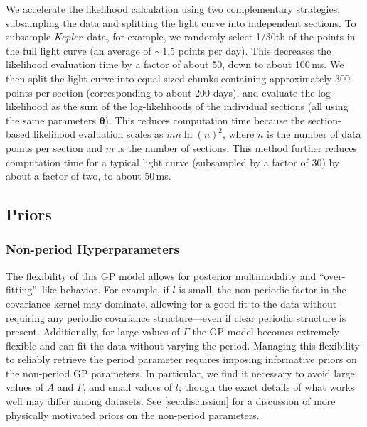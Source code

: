 \documentclass[useAMS, usenatbib, preprint, 12pt]{aastex}
\newcommand{\Kepler}{{\it Kepler}}
\begin{document}
We accelerate the likelihood calculation using two complementary strategies:
subsampling the data and splitting the light curve into independent sections.
To subsample \Kepler\ data, for example,
we randomly select 1/30th of the points
in the full light curve (an average of $\sim$1.5 points per day).
This decreases the likelihood evaluation time by a factor of about 50, down to
about 100\,ms.
We then split the light curve into equal-sized chunks containing approximately
300 points per section (corresponding to about 200 days), and evaluate the
log-likelihood as the sum of the log-likelihoods of the individual sections
(all using the same parameters ${\bm \theta}$).
This reduces computation time because the section-based likelihood evaluation
scales as $mn\ln(n)^2$, where $n$ is the number of data points per section and
$m$ is the number of sections.
This method further reduces computation time for a typical light curve
(subsampled by a factor of 30) by about a factor of two, to about 50\,ms.

\subsection{Priors}
\label{sec:GP_prior}

\subsubsection{Non-period Hyperparameters}
\label{sec:nonperiod_prior}

The flexibility of this GP model allows for posterior multimodality and
``over-fitting''--like behavior.
For example, if $l$ is small, the non-periodic factor in the covariance
kernel may dominate, allowing for a good fit to the data without
requiring any periodic covariance structure---even if clear periodic
structure is present.
Additionally, for large values of $\Gamma$ the GP model becomes extremely
flexible and can fit the data without varying the period.
Managing this flexibility to reliably retrieve the period parameter requires
imposing informative priors on the non-period GP parameters.
In particular, we find it necessary to avoid large values of
$A$ and $\Gamma$, and small values of $l$; though the exact details of what
works well may differ among datasets.
See \textsection \ref{sec:discussion} for a discussion of more physically
motivated priors on the non-period parameters.
\end{document}
